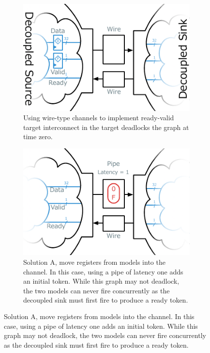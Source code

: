 \begin{figure}
    \centering
    \begin{subfigure}[t]{0.6\textwidth}
        \includegraphics[width=\textwidth]{figures/deadlock.pdf}
        \caption{Using wire-type channels to implement ready-valid target interconnect in the target deadlocks the graph at time zero.}
        \label{fig:deadlock}
    \end{subfigure}\vspace{0.5cm}
    \begin{subfigure}[t]{0.48\textwidth}
        \includegraphics[width=\textwidth]{figures/pipe-decoupled-example.pdf}
        \caption{Solution A, move registers from models into the channel. In
        this case, using a pipe of latency one adds an initial token. While
        this graph may not deadlock, the two models can never fire concurrently
        as the decoupled sink must first fire to produce a ready token.}
        \label{fig:pipe-decoupled-example}

\end{subfigure}
\end{figure}
